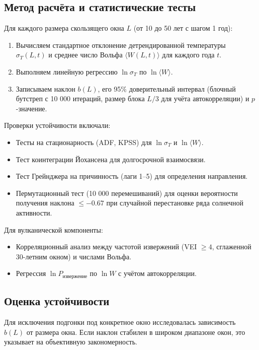 \documentclass[12pt,a4paper]{article}
\begin{document}
	\subsection{Метод расчёта и статистические тесты}
	
	Для каждого размера скользящего окна \(L\) (от 10 до 50 лет с шагом 1 год):
	\begin{enumerate}
		\item Вычисляем стандартное отклонение детрендированной температуры \(\sigma_T(L,t)\) и среднее число Вольфа \(\langle W(L,t) \rangle\) для каждого года \(t\).
		\item Выполняем линейную регрессию \(\ln \sigma_T\) по \(\ln \langle W \rangle\).
		\item Записываем наклон \(b(L)\), его 95\% доверительный интервал (блочный бутстреп с 10 000 итераций, размер блока \(L/3\) для учёта автокорреляции) и \(p\)-значение.
	\end{enumerate}
	
	Проверки устойчивости включали:
	\begin{itemize}
		\item Тесты на стационарность (ADF, KPSS) для \(\ln \sigma_T\) и \(\ln \langle W \rangle\).
		\item Тест коинтеграции Йохансена для долгосрочной взаимосвязи.
		\item Тест Грейнджера на причинность (лаги 1–5) для определения направления.
		\item Пермутационный тест (10 000 перемешиваний) для оценки вероятности получения наклона \(\le -0.67\) при случайной перестановке ряда солнечной активности.
	\end{itemize}
	
	Для вулканической компоненты:
	\begin{itemize}
		\item Корреляционный анализ между частотой извержений (VEI \(\ge 4\), сглаженной 30-летним окном) и числами Вольфа.
		\item Регрессия \(\ln P_{\text{извержение}}\) по \(\ln W\) с учётом автокорреляции.
	\end{itemize}
	
	\subsection{Оценка устойчивости}
	
	Для исключения подгонки под конкретное окно исследовалась зависимость \(b(L)\) от размера окна. Если наклон стабилен в широком диапазоне окон, это указывает на объективную закономерность.
	
\end{document}
